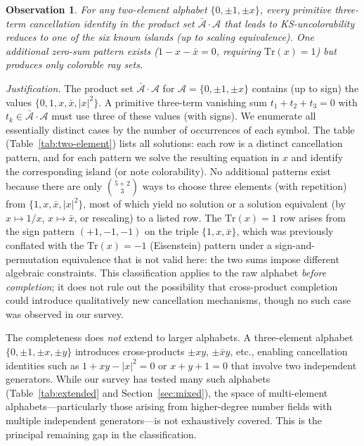 \documentclass[12pt,a4paper]{article}
\newtheorem{observation}[theorem]{Observation}
\begin{document}
\begin{observation}\label{obs:two-element}
For any two-element alphabet $\{0, \pm 1, \pm x\}$, every primitive three-term cancellation identity in the product set $\bar{\mathcal{A}} \cdot \mathcal{A}$ that leads to KS-uncolorability reduces to one of the six known islands (up to scaling equivalence).  One additional zero-sum pattern exists ($1 - x - \bar{x} = 0$, requiring $\mathrm{Tr}(x) = 1$) but produces only colorable ray sets.
\end{observation}

\emph{Justification.} The product set $\bar{\mathcal{A}} \cdot \mathcal{A}$ for $\mathcal{A} = \{0, \pm 1, \pm x\}$ contains (up to sign) the values $\{0, 1, x, \bar{x}, |x|^2\}$.  A primitive three-term vanishing sum $t_1 + t_2 + t_3 = 0$ with $t_k \in \bar{\mathcal{A}} \cdot \mathcal{A}$ must use three of these values (with signs).  We enumerate all essentially distinct cases by the number of occurrences of each symbol.  The table (Table~\ref{tab:two-element}) lists all solutions: each row is a distinct cancellation pattern, and for each pattern we solve the resulting equation in $x$ and identify the corresponding island (or note colorability).  No additional patterns exist because there are only $\binom{5+2}{3}$ ways to choose three elements (with repetition) from $\{1, x, \bar{x}, |x|^2\}$, most of which yield no solution or a solution equivalent (by $x \mapsto 1/x$, $x \mapsto \bar{x}$, or rescaling) to a listed row.  The $\mathrm{Tr}(x) = 1$ row arises from the sign pattern $(+1, -1, -1)$ on the triple $\{1, x, \bar{x}\}$, which was previously conflated with the $\mathrm{Tr}(x) = -1$ (Eisenstein) pattern under a sign-and-permutation equivalence that is not valid here: the two sums impose different algebraic constraints.  This classification applies to the raw alphabet \emph{before completion}; it does not rule out the possibility that cross-product completion could introduce qualitatively new cancellation mechanisms, though no such case was observed in our survey.

The completeness does \emph{not} extend to larger alphabets.  A three-element alphabet $\{0, \pm 1, \pm x, \pm y\}$ introduces cross-products $\pm xy$, $\pm \bar{x}y$, etc., enabling cancellation identities such as $1 + xy - |x|^2 = 0$ or $x + y + 1 = 0$ that involve two independent generators.  While our survey has tested many such alphabets (Table~\ref{tab:extended} and Section~\ref{sec:mixed}), the space of multi-element alphabets---particularly those arising from higher-degree number fields with multiple independent generators---is not exhaustively covered.  This is the principal remaining gap in the classification.
\end{document}

